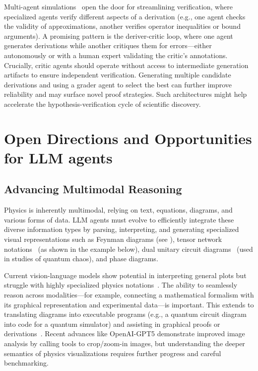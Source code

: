 Multi-agent simulations~\cite{Zhang2025Collective,Du2023Improving,Wu2023AutoGen,Zou2025Agente,MultiAgent4Science} open the door for streamlining verification, where specialized agents verify different aspects of a derivation (e.g., one agent checks the validity of approximations, another verifies operator inequalities or bound arguments). A promising pattern is the deriver-critic loop, where one agent generates derivations while another critiques them for errors---either autonomously or with a human expert validating the critic's annotations. Crucially, critic agents should operate without access to intermediate generation artifacts to ensure independent verification. Generating multiple candidate derivations and using a grader agent to select the best can further improve reliability and may surface novel proof strategies. Such architectures might help accelerate the hypothesis-verification cycle of scientific discovery.

\section{Open Directions and Opportunities for LLM agents}
\label{sec:future_llms}
\subsection{Advancing Multimodal Reasoning}
\label{sec:advancing_multimodal}
Physics is inherently multimodal, relying on text, equations, diagrams, and various forms of data. LLM agents must evolve to efficiently integrate these diverse information types by parsing, interpreting, and generating specialized visual representations such as Feynman diagrams (see ), tensor network notations~\cite{Cirac2021Matrix} (as shown in the example below), dual unitary circuit diagrams~\cite{Bertini2019Exact} (used in studies of quantum chaos), and phase diagrams.

Current vision-language models show potential in interpreting general plots but struggle with highly specialized physics notations~\cite{Bang2023Multitask}. The ability to seamlessly reason across modalities---for example, connecting a mathematical formalism with its graphical representation and experimental data---is important. This extends to translating diagrams into executable programs (e.g., a quantum circuit diagram into code for a quantum simulator) and assisting in graphical proofs or derivations~\cite{Jaffe2018Mathematical}. Recent advances like OpenAI-GPT5 demonstrate improved image analysis by calling tools to crop/zoom-in images, but understanding the deeper semantics of physics visualizations requires further progress and careful benchmarking.

